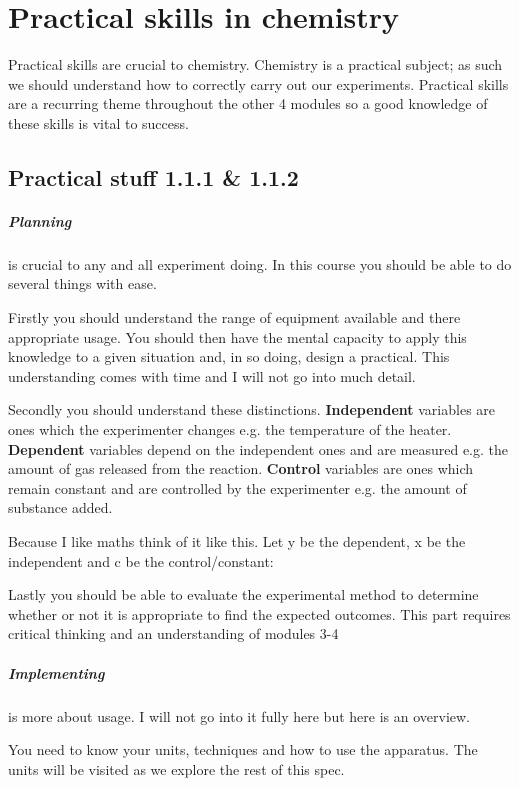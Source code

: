 \chapter{Practical skills in chemistry}
	Practical skills are crucial to chemistry.
	Chemistry is a practical subject; as such we should understand how to correctly carry out our experiments.
	Practical skills are a recurring theme throughout the other 4 modules so a good knowledge of these skills is vital to success.

\section{Practical stuff 1.1.1 \& 1.1.2}
	\paragraph{Planning} is crucial to any and all experiment doing.
	In this course you should be able to do several things with ease.
	
	Firstly you should understand the range of equipment available and there appropriate usage.
	You should then have the mental capacity to apply this knowledge to a given situation and, in so doing, design a practical.
	This understanding comes with time and I will not go into much detail.
	
	Secondly you should understand these distinctions.
	\textbf{Independent} variables are ones which the experimenter changes e.g. the temperature of the heater.
	\textbf{Dependent} variables depend on the independent ones and are measured e.g. the amount of gas released from the reaction.
	\textbf{Control} variables are ones which remain constant and are controlled by the experimenter e.g. the amount of substance added.
	
	Because I like maths think of it like this. Let y be the dependent, x be the independent and c be the control/constant:
	
	Lastly you should be able to evaluate the experimental method to determine whether or not it is appropriate to find the expected outcomes.
	This part requires critical thinking and an understanding of modules 3-4
	
	\paragraph{Implementing} is more about usage.
	I will not go into it fully here but here is an overview.
	
	You need to know your units, techniques and how to use the apparatus.
	The units will be visited as we explore the rest of this spec.
	
